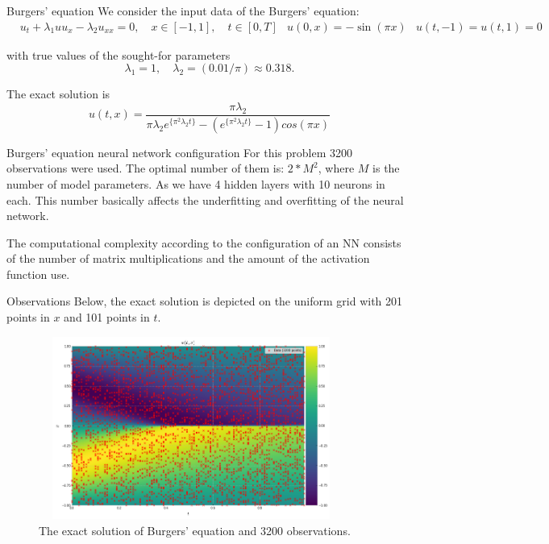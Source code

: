 \documentclass{beamer}
\def\\{}%
\begin{document}
\begin{frame}{Burgers' equation}
We consider the input data of the Burgers' equation:
\begin{align*}
&u_t + \lambda_1 u u_x - \lambda_2 u_{xx} = 0, \quad x\in[-1, 1], \quad t\in[0, T]\\
&u(0, x) = -\sin(\pi x) \\
&u(t, -1) = u(t, 1) = 0
\end{align*}

with true values of the sought-for parameters
\[
    \lambda_1 = 1,  \quad \lambda_2 = (0.01 / \pi) \approx 0.318.
\]

The exact solution is
$$u(t, x) = \frac{\pi \lambda_2}{\pi \lambda_2 e^{\{\pi^2 \lambda_2 t\}} - (e^{\{\pi^2 \lambda_2 t\}} - 1) cos(\pi x)}$$

\end{frame}

\begin{frame}{Burgers' equation neural network configuration}
    For this problem 3200 observations were used. The optimal number of them is: $2*M^2$, where $M$ is the number of model parameters. As we have 4 hidden layers with 10 neurons in each. This number basically affects the underfitting and overfitting of the neural network. \\
    
    The computational complexity according to the configuration of an NN consists of the number of matrix multiplications and the amount of the activation function use. 
    
\end{frame}

\begin{frame}{Observations}
\small
Below, the exact solution is depicted on the uniform grid with 201 points in $x$ and 101 points in $t$. 
\begin{figure}
    \centering
    \includegraphics[width=10cm, height=6cm]{images/burgers-exact.png}
    \caption{The exact solution of Burgers' equation and 3200 observations.}
    \label{fig:my_label}
\end{figure}

\end{frame}
\end{document}

